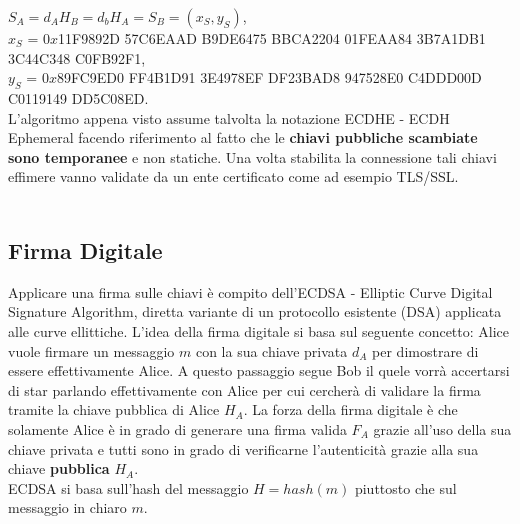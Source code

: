 \documentclass[a4paper,12pt]{tesiinfo}
\begin{document}
$S_A = d_AH_B = d_bH_A = S_B = (x_S, y_S)$,\\
$x_S$ = $0x$11F9892D 57C6EAAD B9DE6475 BBCA2204 01FEAA84 3B7A1DB1 3C44C348 C0FB92F1,\\
$y_S$ = $0x$89FC9ED0 FF4B1D91 3E4978EF DF23BAD8 947528E0 C4DDD00D C0119149 DD5C08ED.
\\
L'algoritmo appena visto assume talvolta la notazione ECDHE - ECDH Ephemeral facendo riferimento al fatto che le \textbf{chiavi pubbliche scambiate sono temporanee} e non statiche. Una volta stabilita la connessione tali chiavi effimere vanno validate da un ente certificato come ad esempio TLS/SSL.
\\
\\
\subsection{Firma Digitale}
Applicare una firma sulle chiavi \`e compito dell'ECDSA - Elliptic Curve Digital Signature Algorithm, diretta variante di un protocollo esistente (DSA) applicata alle curve ellittiche. L'idea della firma digitale si basa sul seguente concetto: Alice vuole firmare un messaggio $m$ con la sua chiave privata $d_A$ per dimostrare di essere effettivamente Alice. A questo passaggio segue Bob il quele vorr\`a accertarsi di star parlando effettivamente con Alice per cui cercher\`a di validare la firma tramite la chiave pubblica di Alice $H_A$. La forza della firma digitale \`e che solamente Alice \`e in grado di generare una firma valida $F_A$ grazie all'uso della sua chiave privata e tutti sono in grado di verificarne l'autenticit\`a grazie alla sua chiave \textbf{pubblica} $H_A$.
\\
ECDSA si basa sull'hash del messaggio $H = hash(m)$ piuttosto che sul messaggio in chiaro $m$.
\end{document}
